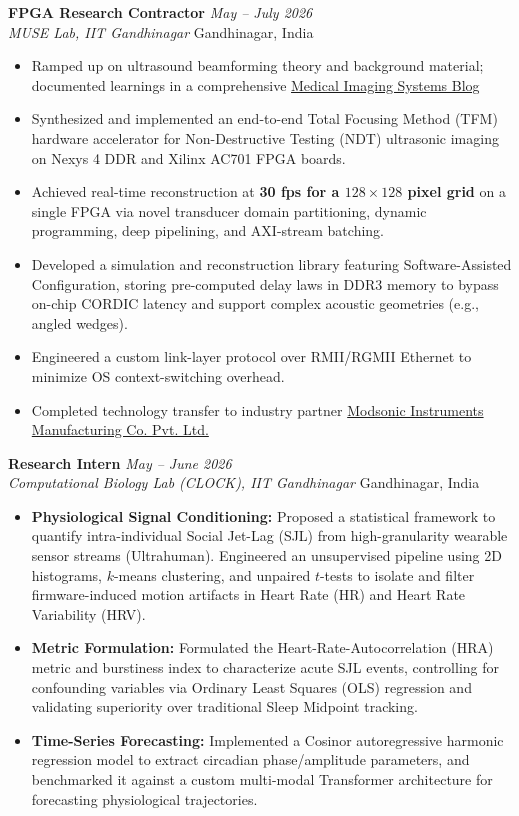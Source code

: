 \documentclass[10pt,a4paper]{article}
\newcommand{\entryheader}[4]{
  \textbf{#1} \hfill \textit{#2} \\
  \textit{#3} \hfill #4 \vspace{2pt}
}
\begin{document}
\vspace{4pt}
\entryheader{FPGA Research Contractor}{May -- July 2026}{MUSE Lab, IIT Gandhinagar}{Gandhinagar, India}
\begin{itemize}
    \item Ramped up on ultrasound beamforming theory and background material; documented learnings in a comprehensive \href{https://pranav-joshi-iitgn.github.io/Medical_Imaging_Blog/}{Medical Imaging Systems Blog}
    \item Synthesized and implemented an end-to-end Total Focusing Method (TFM) hardware accelerator for Non-Destructive Testing (NDT) ultrasonic imaging on Nexys 4 DDR and Xilinx AC701 FPGA boards.
    \item Achieved real-time reconstruction at \textbf{30 fps for a $128 \times 128$ pixel grid} on a single FPGA via novel transducer domain partitioning, dynamic programming, deep pipelining, and AXI-stream batching.
    \item Developed a simulation and reconstruction library featuring Software-Assisted Configuration, storing pre-computed delay laws in DDR3 memory to bypass on-chip CORDIC latency and support complex acoustic geometries (e.g., angled wedges).
    \item Engineered a custom link-layer protocol over RMII/RGMII Ethernet to minimize OS context-switching overhead.
    \item Completed technology transfer to industry partner \href{https://modsonic.com/}{Modsonic Instruments Manufacturing Co. Pvt. Ltd.}
\end{itemize}

\vspace{4pt}
\entryheader{Research Intern}{May -- June 2026}{Computational Biology Lab (CLOCK), IIT Gandhinagar}{Gandhinagar, India}
\begin{itemize}
    \item \textbf{Physiological Signal Conditioning:} Proposed a statistical framework to quantify intra-individual Social Jet-Lag (SJL) from high-granularity wearable sensor streams (Ultrahuman). Engineered an unsupervised pipeline using 2D histograms, $k$-means clustering, and unpaired $t$-tests to isolate and filter firmware-induced motion artifacts in Heart Rate (HR) and Heart Rate Variability (HRV).
    \item \textbf{Metric Formulation:} Formulated the Heart-Rate-Autocorrelation (HRA) metric and burstiness index to characterize acute SJL events, controlling for confounding variables via Ordinary Least Squares (OLS) regression and validating superiority over traditional Sleep Midpoint tracking.
    \item \textbf{Time-Series Forecasting:} Implemented a Cosinor autoregressive harmonic regression model to extract circadian phase/amplitude parameters, and benchmarked it against a custom multi-modal Transformer architecture for forecasting physiological trajectories.
\end{itemize}
\end{document}
